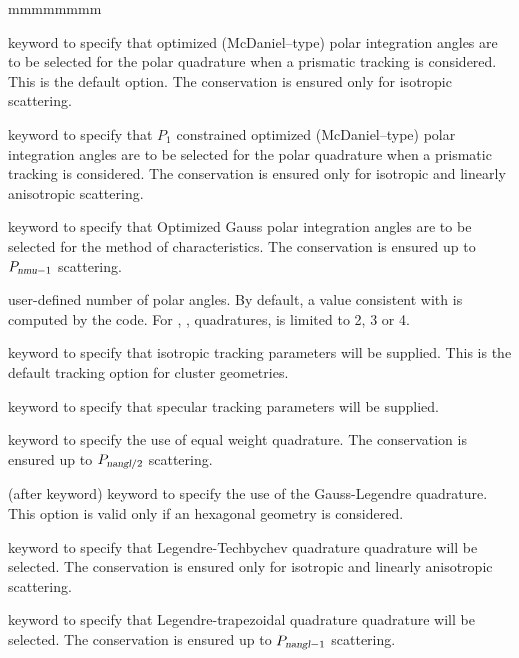 \begin{ListeDeDescription}{mmmmmmmm}
\item[\moc{LCMD}] keyword to specify that optimized (McDaniel--type) polar integration angles are to be
selected for the polar quadrature when a prismatic tracking is considered.\cite{LCMD} This is the default option. The conservation is ensured only for isotropic scattering.

\item[\moc{OPP1}] keyword to specify that $P_1$ constrained optimized (McDaniel--type) polar integration angles are to be selected for the polar quadrature when a prismatic tracking is considered.\cite{LeTellierpa} The conservation is ensured only for isotropic and linearly anisotropic scattering.

\item[\moc{OGAU}] keyword to specify that Optimized Gauss polar integration angles are to be
selected for the method of characteristics.\cite{LCMD,LeTellierpa} The conservation is ensured up to $P_{\dusa{nmu}-1}$ scattering.

\item[\dusa{nmu}]  user-defined number of polar angles. By default, a value consistent with  is computed by the code. For , ,  quadratures,  is limited to 2, 3 or 4.

\item[\moc{TISO}] keyword to specify that isotropic tracking parameters will be supplied. This is the
default tracking option for cluster geometries. 

\item[\moc{TSPC}] keyword to specify that specular tracking parameters will be
supplied.

\item[\moc{EQW}] keyword to specify the use of equal weight quadrature.\cite{eqn} The conservation is ensured up to $P_{\dusa{nangl}/2}$ scattering.

\item[\moc{GAUS}] (after  keyword) keyword to specify the use of the Gauss-Legendre quadrature. This option is valid only if an 
hexagonal geometry is considered.

\item[\moc{PNTN}] keyword to specify that Legendre-Techbychev quadrature quadrature will be selected.\cite{pntn} The conservation is ensured only for isotropic and linearly anisotropic scattering.

\item[\moc{SMS}] keyword to specify that Legendre-trapezoidal quadrature quadrature will be selected.\cite{sms} The conservation is ensured up to $P_{\dusa{nangl}-1}$ scattering.


\end{ListeDeDescription}
